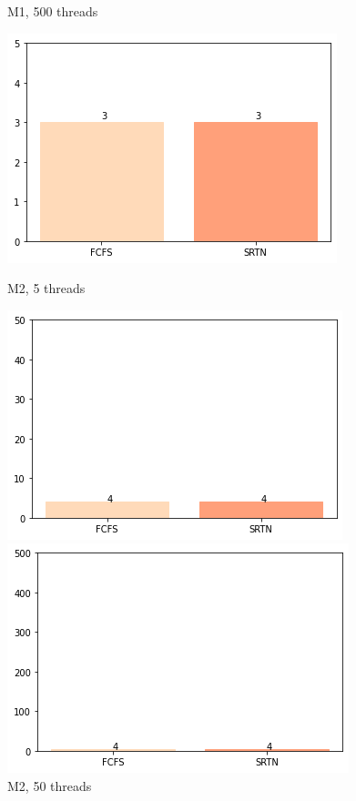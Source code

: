 \documentclass{beamer}
\begin{document}
\begin{frame}
\begin{figure}[!htb]
  \caption{M1, 500 threads}\label{fig:awesome_image3}
\endminipage
\end{figure}





\begin{figure}[!htb]
  \includegraphics[width=\linewidth]{imgs/deadline5-2}
  \caption{M2, 5 threads}\label{fig:awesome_image1}
\endminipage\hfill
{}
  \includegraphics[width=\linewidth]{imgs/deadline50-2}
  \caption{M2, 50 threads}\label{fig:awesome_image2}
\endminipage\hfill
{}%
  \includegraphics[width=\linewidth]{imgs/deadline500-2}

\end{figure}
\end{frame}
\end{document}
